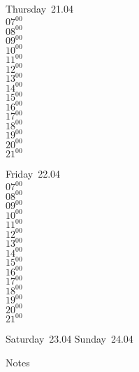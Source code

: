 \documentclass[11pt,a4paper]{book}\usepackage[]{graphicx}\usepackage[]{color}
\begin{document}
\clearpage
\begin{headerbox}
\end{headerbox}
\begin{weekdaybox}
  Thursday~21.04\\
  { 
  \vfill
  $07^{00}$\\
$08^{00}$\\
$09^{00}$\\
$10^{00}$\\
$11^{00}$\\
$12^{00}$\\
$13^{00}$\\
$14^{00}$\\
$15^{00}$\\
$16^{00}$\\
$17^{00}$\\
$18^{00}$\\
$19^{00}$\\
$20^{00}$\\
$21^{00}$\\
  }
\end{weekdaybox} 
\begin{weekdaybox}
  Friday~22.04\\
  { 
  \vfill
  $07^{00}$\\
$08^{00}$\\
$09^{00}$\\
$10^{00}$\\
$11^{00}$\\
$12^{00}$\\
$13^{00}$\\
$14^{00}$\\
$15^{00}$\\
$16^{00}$\\
$17^{00}$\\
$18^{00}$\\
$19^{00}$\\
$20^{00}$\\
$21^{00}$\\
  }
\end{weekdaybox}
\begin{weekendbox}
  Saturday~23.04
  \tcblower
  Sunday~24.04
\end{weekendbox} %
\begin{notebox}
  Notes
\end{notebox}
\clearpage
\end{document}
